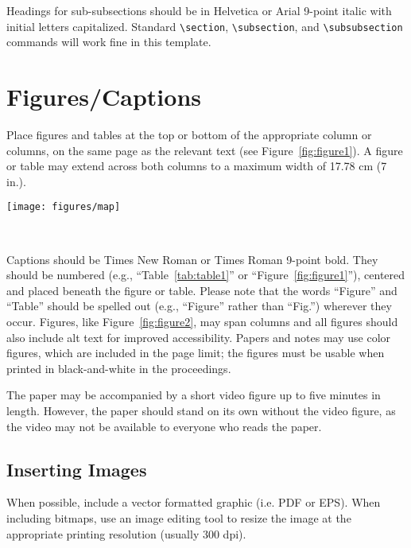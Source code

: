 \documentclass{sigchi}
\begin{document}
Headings for sub-subsections should be in Helvetica or Arial 9-point
italic with initial letters capitalized.  Standard
\texttt{{\textbackslash}section}, \texttt{{\textbackslash}subsection},
and \texttt{{\textbackslash}subsubsection} commands will work fine in
this template.

\section{Figures/Captions}

Place figures and tables at the top or bottom of the appropriate
column or columns, on the same page as the relevant text (see
Figure~\ref{fig:figure1}). A figure or table may extend across both
columns to a maximum width of 17.78 cm (7 in.).

\begin{figure*}
  \centering
  \texttt{[image: figures/map]}
  \caption{In this image, the map maximizes use of space. You can make
    figures as wide as you need, up to a maximum of the full width of
    both columns. Note that \LaTeX\ tends to render large figures on a
    dedicated page. Image: \ccbynd~ayman on
    Flickr.}~\label{fig:figure2}
\end{figure*}

Captions should be Times New Roman or Times Roman 9-point bold.  They
should be numbered (e.g., ``Table~\ref{tab:table1}'' or
``Figure~\ref{fig:figure1}''), centered and placed beneath the figure
or table.  Please note that the words ``Figure'' and ``Table'' should
be spelled out (e.g., ``Figure'' rather than ``Fig.'') wherever they
occur. Figures, like Figure~\ref{fig:figure2}, may span columns and
all figures should also include alt text for improved accessibility.
Papers and notes may use color figures, which are included in the page
limit; the figures must be usable when printed in black-and-white in
the proceedings.

The paper may be accompanied by a short video figure up to five
minutes in length. However, the paper should stand on its own without
the video figure, as the video may not be available to everyone who
reads the paper.  

\subsection{Inserting Images}
When possible, include a vector formatted graphic (i.e. PDF or EPS).
When including bitmaps,  use an image editing tool to resize the image
at the appropriate printing resolution (usually 300 dpi).
\end{document}

